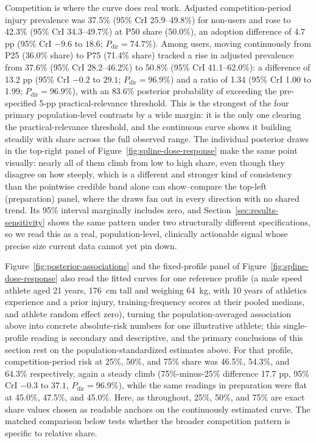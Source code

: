 Competition is where the curve does real work. Adjusted competition-period injury prevalence was 37.5\% (95\% CrI 25.9--49.8\%) for non-users and rose to 42.3\% (95\% CrI 34.3--49.7\%) at P50 share (50.0\%), an adoption difference of 4.7 pp (95\% CrI $-9.6$ to $18.6$; $P_{\mathrm{dir}}=74.7\%$). Among users, moving continuously from P25 (36.0\% share) to P75 (71.4\% share) tracked a rise in adjusted prevalence from 37.6\% (95\% CrI 28.2--46.2\%) to 50.8\% (95\% CrI 41.1--62.0\%): a difference of 13.2 pp (95\% CrI $-0.2$ to $29.1$; $P_{\mathrm{dir}}=96.9\%$) and a ratio of 1.34 (95\% CrI 1.00 to 1.99; $P_{\mathrm{dir}}=96.9\%$), with an 83.6\% posterior probability of exceeding the pre-specified 5-pp practical-relevance threshold. This is the strongest of the four primary population-level contrasts by a wide margin: it is the only one clearing the practical-relevance threshold, and the continuous curve shows it building steadily with share across the full observed range. The individual posterior draws in the top-right panel of Figure~\ref{fig:spline-dose-response} make the same point visually: nearly all of them climb from low to high share, even though they disagree on how steeply, which is a different and stronger kind of consistency than the pointwise credible band alone can show--compare the top-left (preparation) panel, where the draws fan out in every direction with no shared trend. Its 95\% interval marginally includes zero, and Section~\ref{sec:results-sensitivity} shows the same pattern under two structurally different specifications, so we read this as a real, population-level, clinically actionable signal whose precise size current data cannot yet pin down.

Figure~\ref{fig:posterior-associations} and the fixed-profile panel of Figure~\ref{fig:spline-dose-response} also read the fitted curves for one reference profile (a male speed athlete aged 21 years, 176~cm tall and weighing 64~kg, with 10 years of athletics experience and a prior injury, training-frequency scores at their pooled medians, and athlete random effect zero), turning the population-averaged association above into concrete absolute-risk numbers for one illustrative athlete; this single-profile reading is secondary and descriptive, and the primary conclusions of this section rest on the population-standardized estimates above. For that profile, competition-period risk at 25\%, 50\%, and 75\% share was 46.5\%, 54.3\%, and 64.3\% respectively, again a steady climb (75\%-minus-25\% difference 17.7 pp, 95\% CrI $-0.3$ to $37.1$, $P_{\mathrm{dir}}=96.9\%$), while the same readings in preparation were flat at 45.0\%, 47.5\%, and 45.0\%. Here, as throughout, 25\%, 50\%, and 75\% are exact share values chosen as readable anchors on the continuously estimated curve. The matched comparison below tests whether the broader competition pattern is specific to relative share.

